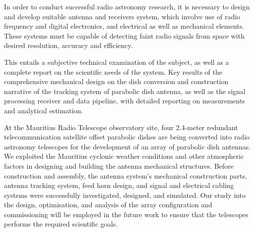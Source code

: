 {In order to conduct successful radio astronomy research, it is necessary to design and develop suitable antenna and receivers system, which involve use of radio frequency and digital electronics, and electrical as well as mechanical elements.
These systems must be capable of detecting faint radio signals from space with desired resolution, accuracy and efficiency. %

This entails a subjective technical examination of the subject, as well as a complete report on the scientific needs of the system. Key results of the comprehensive mechanical design on the dish conversion and construction narrative of the tracking system of parabolic dish antenna, as well as the signal processing receiver and data pipeline, with detailed reporting on measurements and analytical estimation.

At the Mauritius Radio Telescope observatory site, four 2.4-meter redundant telecommunication satellite offset parabolic dishes are being converted into radio astronomy telescopes for the development of an array of parabolic dish antennas.
 We exploited the Mauritius cyclonic weather conditions and other atmospheric factors in designing and building the antenna mechanical structures.
Before construction and assembly, the antenna system's mechanical construction parts, antenna tracking system, feed horn design, and signal and electrical cabling systems were successfully investigated, designed, and simulated.
Our study into the design, optimisation, and analysis of the array configuration and commissioning will be employed in the future work to ensure that the telescopes performs  the required scientific goals.
 

}
